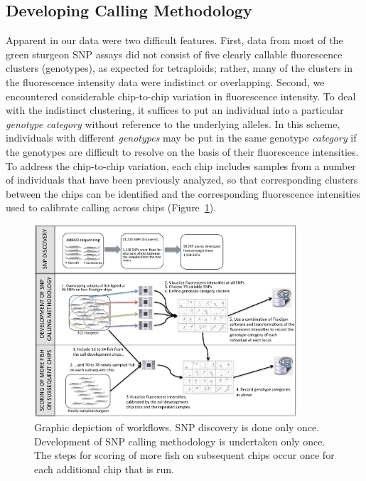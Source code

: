 \documentclass[twocolumn,natbib]{svjour3}       %
\begin{document}
\subsection{Developing Calling Methodology}
Apparent in our data were two difficult features. First, data from most of the green sturgeon SNP
assays did not consist of five clearly callable
fluorescence clusters (genotypes), as expected for tetraploids; rather, many of
the clusters in the fluorescence intensity data were indistinct or overlapping.
Second, we encountered considerable chip-to-chip variation in fluorescence
intensity. To deal with the indistinct clustering, it suffices to put an
individual into a particular {\em genotype category} without reference to the
underlying alleles. In this scheme, individuals with different {\em genotypes} may be put in the
same genotype {\em category} if the genotypes are difficult to resolve on
the basis of their fluorescence intensities. To address the chip-to-chip
variation, each chip includes samples from a number of individuals that have
been previously analyzed, so that corresponding clusters between the chips can
be identified and the corresponding fluorescence intensities used to calibrate calling across chips (Figure~\ref{fig:flowchart}).
\begin{figure}
\begin{center}
\includegraphics[width=0.87\textwidth]{flow-chart-crop.pdf}
\end{center}
\caption{Graphic depiction of workflows.  SNP discovery is done only once.  Development
of SNP calling methodology is undertaken only once.  The steps for 
scoring of more fish on subsequent chips occur once for each additional chip
that is run.}
\label{fig:flowchart}
\end{figure}
\end{document}
